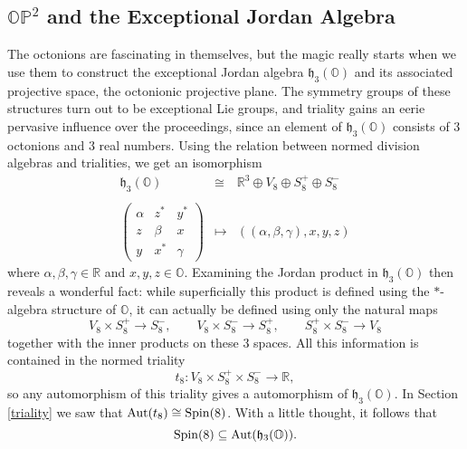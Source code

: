 \documentclass[12pt]{article}
\newcommand\R{{\mathbb R}}
\renewcommand\O{{\mathbb O}}
\newcommand\OP{{\mathbb {OP}}}
\newcommand{\Spin}{{\rm Spin}}
\newcommand{\h}{{\mathfrak {h}}}
\newcommand{\Aut}{{\rm Aut}}
\newcommand{\iso}{\cong}
\newcommand{\be}{\begin{equation}}
\newcommand{\ee}{\end{equation}}
\newcommand{\maps}{\colon}
\begin{document}
\subsection{$\OP^2$ and the Exceptional Jordan Algebra}  \label{OP2} 
 
The octonions are fascinating in themselves, but the magic really starts
when we use them to construct the exceptional Jordan algebra $\h_3(\O)$
and its associated projective space, the octonionic projective plane. 
The symmetry groups of these structures turn out to be exceptional Lie 
groups, and triality gains an eerie pervasive influence over the
proceedings, since an element of $\h_3(\O)$ consists of 3 octonions and
3 real numbers.  Using the relation between normed division algebras and
trialities, we get an isomorphism 
\be 
\begin{array} {ccc} 
  \h_3(\O) & \iso & \R^3 \oplus V_8 \oplus S_8^+ \oplus S_8^-   \\ 
{} & {} & {}  \\
\left( \begin{array}{ccc}  
                         \alpha  &  z^*  & y^*    \\  
                         z       & \beta & x      \\ 
                         y       & x^*   & \gamma   
\end{array} \right) & \mapsto & ((\alpha,\beta,\gamma),x,y,z)   
\end{array} 
\label{jordan.triality} \ee  
where $\alpha,\beta,\gamma \in \R$ and $x,y,z \in \O$.   Examining the
Jordan product in $\h_3(\O)$ then reveals a wonderful fact: while
superficially this product is defined using the $\ast$-algebra structure
of $\O$, it can actually be defined using only the natural maps 
\[      V_8 \times S_8^+ \to S_8^- , \qquad
        V_8 \times S_8^- \to S_8^+ , \qquad
        S_8^+ \times S_8^- \to V_8  
\]  
together with the inner products on these 3 spaces.   All this
information is contained in the normed triality 
\[     t_8 \maps V_8 \times S_8^+ \times S_8^- \to \R ,\]
so any automorphism of this triality gives a automorphism of $\h_3(\O)$.
In Section \ref{triality} we saw that $\Aut(t_8) \iso \Spin(8)$.  With
a little thought, it follows that 
\[    \Spin(8) \subseteq \Aut(\h_3(\O))   .\] 
\end{document}
